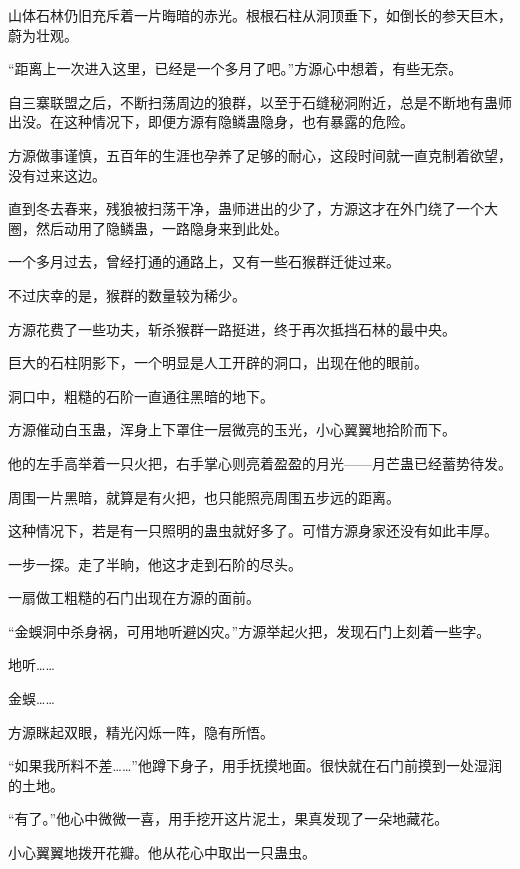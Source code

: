 
\begin{this_body}



山体石林仍旧充斥着一片晦暗的赤光。根根石柱从洞顶垂下，如倒长的参天巨木，蔚为壮观。

“距离上一次进入这里，已经是一个多月了吧。”方源心中想着，有些无奈。

自三寨联盟之后，不断扫荡周边的狼群，以至于石缝秘洞附近，总是不断地有蛊师出没。在这种情况下，即便方源有隐鳞蛊隐身，也有暴露的危险。

方源做事谨慎，五百年的生涯也孕养了足够的耐心，这段时间就一直克制着欲望，没有过来这边。

直到冬去春来，残狼被扫荡干净，蛊师进出的少了，方源这才在外门绕了一个大圈，然后动用了隐鳞蛊，一路隐身来到此处。

一个多月过去，曾经打通的通路上，又有一些石猴群迁徙过来。

不过庆幸的是，猴群的数量较为稀少。

方源花费了一些功夫，斩杀猴群一路挺进，终于再次抵挡石林的最中央。

巨大的石柱阴影下，一个明显是人工开辟的洞口，出现在他的眼前。

洞口中，粗糙的石阶一直通往黑暗的地下。

方源催动白玉蛊，浑身上下罩住一层微亮的玉光，小心翼翼地拾阶而下。

他的左手高举着一只火把，右手掌心则亮着盈盈的月光——月芒蛊已经蓄势待发。

周围一片黑暗，就算是有火把，也只能照亮周围五步远的距离。

这种情况下，若是有一只照明的蛊虫就好多了。可惜方源身家还没有如此丰厚。

一步一探。走了半晌，他这才走到石阶的尽头。

一扇做工粗糙的石门出现在方源的面前。

“金蜈洞中杀身祸，可用地听避凶灾。”方源举起火把，发现石门上刻着一些字。

地听……

金蜈……

方源眯起双眼，精光闪烁一阵，隐有所悟。

“如果我所料不差……”他蹲下身子，用手抚摸地面。很快就在石门前摸到一处湿润的土地。

“有了。”他心中微微一喜，用手挖开这片泥土，果真发现了一朵地藏花。

小心翼翼地拨开花瓣。他从花心中取出一只蛊虫。


\end{this_body}
